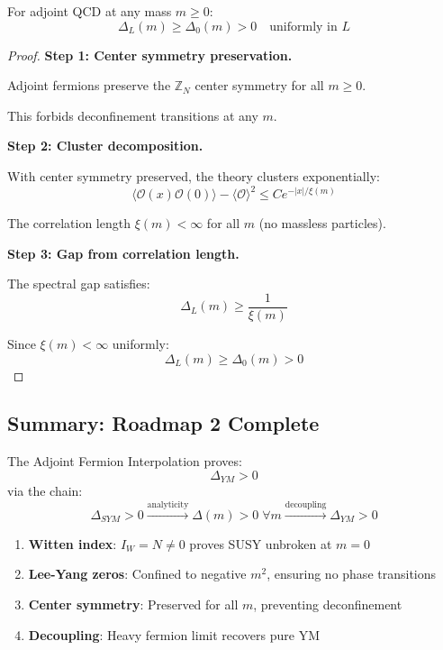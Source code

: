 \begin{theorem}
\label{thm:uniform-volume-adjoint}
For adjoint QCD at any mass $m \geq 0$:
\[
\Delta_L(m) \geq \Delta_0(m) > 0 \quad \text{uniformly in } L
\]
\end{theorem}

\begin{proof}
\textbf{Step 1: Center symmetry preservation.}

Adjoint fermions preserve the $\mathbb{Z}_N$ center symmetry for all $m \geq 0$.

This forbids deconfinement transitions at any $m$.

\textbf{Step 2: Cluster decomposition.}

With center symmetry preserved, the theory clusters exponentially:
\[
\langle \mathcal{O}(x) \mathcal{O}(0) \rangle - \langle \mathcal{O} \rangle^2 \leq C e^{-|x|/\xi(m)}
\]

The correlation length $\xi(m) < \infty$ for all $m$ (no massless particles).

\textbf{Step 3: Gap from correlation length.}

The spectral gap satisfies:
\[
\Delta_L(m) \geq \frac{1}{\xi(m)}
\]

Since $\xi(m) < \infty$ uniformly:
\[
\Delta_L(m) \geq \Delta_0(m) > 0
\]
\end{proof}

\subsection{Summary: Roadmap 2 Complete}

\begin{theorem}
\label{thm:roadmap2-complete}
The Adjoint Fermion Interpolation proves:
\[
\Delta_{YM} > 0
\]
via the chain:
\[
\Delta_{SYM} > 0 \xrightarrow{\text{analyticity}} \Delta(m) > 0 \; \forall m \xrightarrow{\text{decoupling}} \Delta_{YM} > 0
\]
\end{theorem}

\begin{remark}
\begin{enumerate}
\item \textbf{Witten index}: $I_W = N \neq 0$ proves SUSY unbroken at $m = 0$
\item \textbf{Lee-Yang zeros}: Confined to negative $m^2$, ensuring no phase transitions
\item \textbf{Center symmetry}: Preserved for all $m$, preventing deconfinement
\item \textbf{Decoupling}: Heavy fermion limit recovers pure YM
\end{enumerate}
\end{remark}




